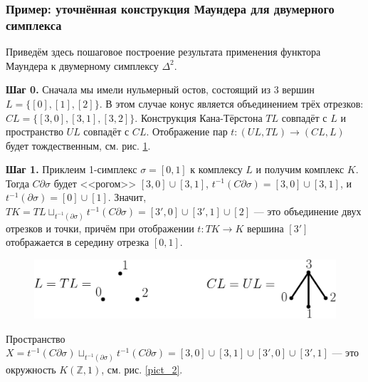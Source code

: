 \documentclass[14pt, dvipsnames, twoside]{extarticle}
\theoremstyle{definition}
\theoremstyle{remark}
\begin{document}
\subsubsection{Пример: уточнённая конструкция Маундера для двумерного симплекса}\label{construction_for_triangle}


Приведём здесь пошаговое построение результата применения функтора Маундера к двумерному симплексу $\Delta^2$.

{\bf Шаг 0.} Сначала мы имели нульмерный остов, состоящий из 3 вершин $L = \{[0], [1],  [2]\}$. В этом случае конус является объединением трёх отрезков: $CL = \{ [3, 0], [3, 1], [3, 2] \}$. Конструкция Кана-Тёрстона $TL$ совпадёт с $L$ и пространство $UL$ совпадёт с $CL$. Отображение пар $t: (UL, TL) \to (CL, L)$ будет тождественным, см. рис. \ref{pict_1}.

{\bf Шаг 1.} Приклеим 1-симплекс $\sigma = [0, 1]$ к комплексу $L$ и получим комплекс $K$. Тогда $C\partial \sigma$ будет <<рогом>> $[3, 0]\cup [3, 1]$, $t^{-1}(C\partial \sigma) = [3, 0]\cup [3, 1]$, и $t^{-1}(\partial\sigma) = [0]\cup [1]$. Значит, $TK = TL\sqcup_{t^{-1}(\partial\sigma)} t^{-1}(C\partial\sigma) = [3', 0]\cup[3', 1]\cup [2]$ --- это объединение двух отрезков и точки, причём при отображении $t: TK\to K$ вершина $[3']$ отображается в середину отрезка $[0, 1]$.

\begin{figure}
\begin{center}
\includegraphics[scale=0.7]{pict1}
\caption{}\label{pict_1}
\end{center}
\end{figure}


Пространство $X = t^{-1}(C\partial\sigma)\sqcup_{t^{-1}(\partial\sigma)} t^{-1}(C\partial\sigma) = [3, 0]\cup [3,1] \cup [3', 0] \cup [3', 1]$ --- это окружность $K(\mathbb{Z}, 1)$, см. рис. \ref{pict_2}. 
\end{document}
